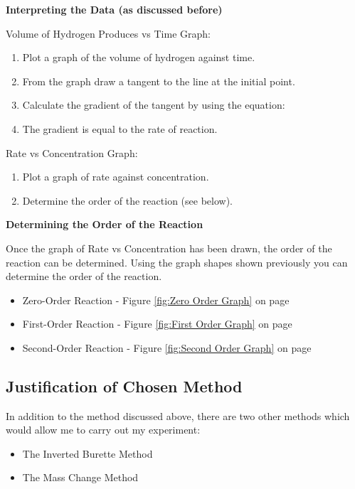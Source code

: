 \textbf{Interpreting the Data (as discussed before)}

Volume of Hydrogen Produces vs Time Graph:
\begin{enumerate}
\item Plot a graph of the volume of hydrogen against time.
\item From the graph draw a tangent to the line at the initial point.
\item Calculate the gradient of the tangent by using the equation: 
\item The gradient is equal to the rate of reaction.
\end{enumerate}

Rate vs Concentration Graph:
\begin{enumerate}
\item Plot a graph of rate against concentration.
\item Determine the order of the reaction (see below).
\end{enumerate}








\textbf{Determining the Order of the Reaction}

Once the graph of Rate vs Concentration has been drawn, the order of the reaction can be determined. Using the graph shapes shown previously you can determine the order of the reaction.

\begin{itemize}
\item Zero-Order Reaction -  Figure \ref{fig:Zero Order Graph} on page \pageref{fig:Zero Order Graph}
\item First-Order Reaction -  Figure \ref{fig:First Order Graph} on page \pageref{fig:First Order Graph}
\item Second-Order Reaction -  Figure \ref{fig:Second Order Graph} on page \pageref{fig:Second Order Graph}
\end{itemize}


	\subsection{Justification of Chosen Method}

In addition to the method discussed above, there are two other methods which would allow me to carry out my experiment:
\begin{itemize}
\item The Inverted Burette Method
\item The Mass Change Method 
\end{itemize}

